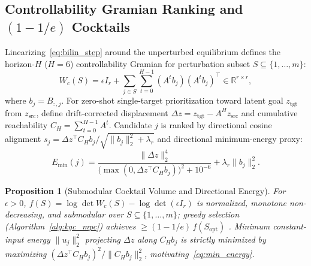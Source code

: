 \documentclass[journal]{IEEEtran}
\newtheorem{proposition}{Proposition}
\begin{document}
\subsection{Controllability Gramian Ranking and $(1-1/e)$ Cocktails}
Linearizing~\eqref{eq:bilin_step} around the unperturbed equilibrium defines the horizon-$H$ ($H=6$) controllability Gramian for perturbation subset $S \subseteq \{1,\dots,m\}$:
\begin{equation}
  W_c(S) = \epsilon I_r + \sum_{j \in S} \sum_{t=0}^{H-1} (A^t b_j)(A^t b_j)^\top \in \mathbb{R}^{r \times r},
  \label{eq:gramian_wc}
\end{equation}
where $b_j = B_{:,j}$. For zero-shot single-target prioritization toward latent goal $z_{\mathrm{tgt}}$ from $z_{\mathrm{src}}$, define drift-corrected displacement $\Delta z = z_{\mathrm{tgt}} - A^H z_{\mathrm{src}}$ and cumulative reachability $C_H = \sum_{t=0}^{H-1} A^t$. Candidate $j$ is ranked by directional cosine alignment $s_j = \Delta z^\top C_H b_j / \sqrt{\|b_j\|_2^2 + \lambda_r}$ and directional minimum-energy proxy:
\begin{equation}
  E_{\min}(j) = \frac{\|\Delta z\|_2^4}{\big(\max(0, \Delta z^\top C_H b_j)\big)^2 + 10^{-6}} + \lambda_r \|b_j\|_2^2.
  \label{eq:min_energy}
\end{equation}

\begin{proposition}[Submodular Cocktail Volume and Directional Energy]
\label{prop:gramian_submod}
For $\epsilon > 0$, $f(S) = \log\det W_c(S) - \log\det(\epsilon I_r)$ is normalized, monotone non-decreasing, and submodular over $S \subseteq \{1,\dots,m\}$; greedy selection (Algorithm~\ref{alg:kgc_mpc}) achieves $\ge (1 - 1/e)\,f(S_{\mathrm{opt}})$ \cite{nemhauser1978analysis,summers2016submodularity}. Minimum constant-input energy $\|u_j\|_2^2$ projecting $\Delta z$ along $C_H b_j$ is strictly minimized by maximizing $(\Delta z^\top C_H b_j)^2 / \|C_H b_j\|_2^2$, motivating~\eqref{eq:min_energy}.
\end{proposition}
\end{document}
